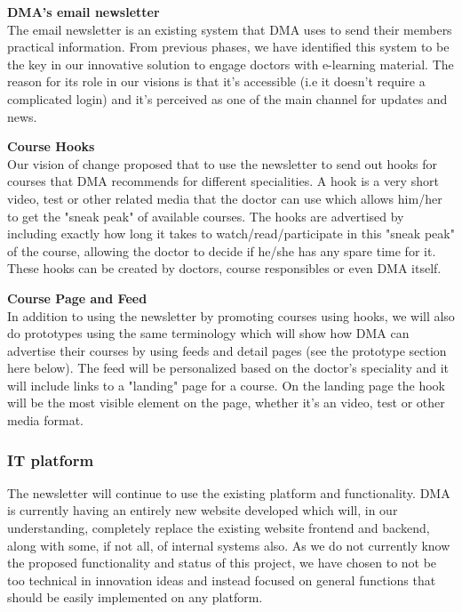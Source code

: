 \textbf{DMA's email newsletter}\\
The email newsletter is an existing system that DMA uses to send their members practical information. From previous phases, we have identified this system to be the key in our innovative solution to engage doctors with e-learning material. The reason for its role in our visions is that it's accessible (i.e it doesn't require a complicated login) and it's perceived as one of the main channel for updates and news.

\textbf{Course Hooks}\\
Our vision of change proposed that to use the newsletter to send out hooks for courses that DMA recommends for different specialities. A hook is a very short video, test or other related media that the doctor can use which allows him/her to get the "sneak peak" of available courses. The hooks are advertised by including exactly how long it takes to watch/read/participate in this "sneak peak" of the course, allowing the doctor to decide if he/she has any spare time for it. These hooks can be created by doctors, course responsibles or even DMA itself.

\textbf{Course Page and Feed}\\
In addition to using the newsletter by promoting courses using hooks, we will also do prototypes using the same terminology which will show how DMA can advertise their courses by using feeds and detail pages (see the prototype section here below). The feed will be personalized based on the doctor's speciality and it will include links to a "landing" page for a course. On the landing page the hook will be the most visible element on the page, whether it's an video, test or other media format.

\subsubsection{IT platform}
The newsletter will continue to use the existing platform and functionality. DMA is currently having an entirely new website developed which will, in our understanding, completely replace the existing website frontend and backend, along with some, if not all, of internal systems also. As we do not currently know the proposed functionality and status of this project, we have chosen to not be too technical in innovation ideas and instead focused on general functions that should be easily implemented on any platform.


